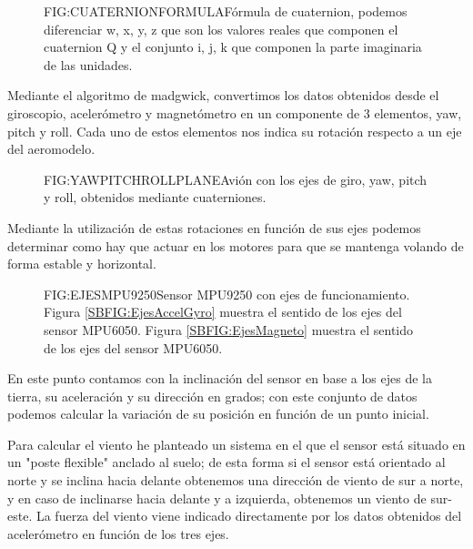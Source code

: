 \begin{figure}[Fórmula cuaternion]{FIG:CUATERNIONFORMULA}{Fórmula de cuaternion, podemos diferenciar w, x, y, z que son los valores reales que componen el cuaternion Q y el conjunto i, j, k que componen la parte imaginaria de las unidades. }
\end{figure}

   Mediante el algoritmo de madgwick, convertimos los datos obtenidos desde el giroscopio, acelerómetro y magnetómetro en un componente de 3 elementos, yaw, pitch y roll.
   Cada uno de estos elementos nos indica su rotación respecto a un eje del aeromodelo. 
 

\begin{figure}[Ejes yaw, pitch y roll]{FIG:YAWPITCHROLLPLANE}{Avión con los ejes de giro, yaw, pitch y roll, obtenidos mediante cuaterniones.}
\end{figure}
 
 Mediante la utilización de estas rotaciones en función de sus ejes podemos determinar como hay que actuar en los motores para que se mantenga volando de forma estable y horizontal.
  

\begin{figure}[Ejes MPU9250]{FIG:EJESMPU9250}{Sensor MPU9250 con ejes de funcionamiento. Figura \ref{SBFIG:EjesAccelGyro} muestra el sentido de los ejes del sensor MPU6050. Figura \ref{SBFIG:EjesMagneto} muestra el sentido de los ejes del sensor MPU6050.}
   \quad
\end{figure} 

 
 En este punto contamos con la inclinación del sensor en base a los ejes de la tierra, su aceleración y su dirección en grados; con este conjunto de datos podemos calcular la variación de su posición en función de un punto inicial.
   
  Para calcular el viento he planteado un sistema en el que el sensor está situado en un "poste flexible" anclado al suelo; de esta forma si el sensor está orientado al norte y se inclina hacia delante obtenemos una dirección de viento de sur a norte, y en caso de inclinarse hacia delante y a izquierda, obtenemos un viento de sur-este. La fuerza del viento viene indicado directamente por los datos obtenidos del acelerómetro en función de los tres ejes.
  
  